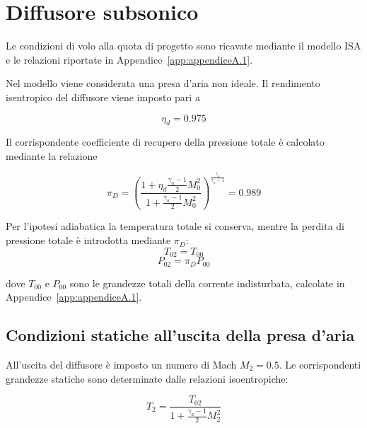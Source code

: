 \section{Diffusore subsonico}
\label{app:presa_aria_subsonica}

Le condizioni di volo alla quota di progetto sono ricavate mediante il modello ISA e le relazioni riportate in Appendice~\ref{app:appendiceA.1}.

Nel modello viene considerata una presa d'aria non ideale. Il rendimento isentropico del diffusore viene imposto pari a

\begin{equation*}
\eta_d=0.975
\end{equation*}

Il corrispondente coefficiente di recupero della pressione totale è calcolato mediante la relazione 

\begin{equation*}
\pi_D=
\left(
\frac{
1+\eta_d\frac{\gamma_a-1}{2}M_0^2
}{
1+\frac{\gamma_a-1}{2}M_0^2
}
\right)^{\frac{\gamma_a}{\gamma_a-1}}
=0.989
\end{equation*}

Per l'ipotesi adiabatica la temperatura totale si conserva, mentre la perdita di pressione totale è introdotta mediante $\pi_D$:
\begin{equation*}
    T_{02}=T_{00}
\end{equation*}
\begin{equation*}
    P_{02}=\pi_D P_{00}
\end{equation*}

dove $T_{00}$ e $P_{00}$ sono le grandezze totali della corrente indisturbata, calcolate in Appendice~\ref{app:appendiceA.1}.


\subsection{Condizioni statiche all'uscita della presa d'aria}

All'uscita del diffusore è imposto un numero di Mach $M_2=0.5$. Le corrispondenti grandezze statiche sono determinate dalle relazioni isoentropiche:

\begin{equation*}
    T_2=
    \frac{T_{02}}
    {1+\frac{\gamma_a-1}{2}M_2^2}
\end{equation*}

